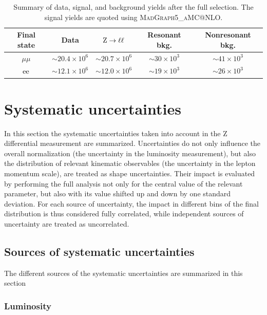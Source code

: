\begin{table}[hbtp]
  \begin{center}
\caption{Summary of data, signal, and background yields after the full selection. 
The signal yields are quoted using \textsc{MadGraph5\_aMC@NLO}.\label{tab:zpt_yields}}
\begin{tabular}{ccccc}
\hline
Final state      & Data & $\mathrm{Z}\to\ell\ell$ & Resonant bkg. & Nonresonant bkg. \\
\hline
$\mu\mu$         & $\sim 20.4 \times 10^{6}$ & $\sim 20.7 \times 10^{6}$ & $\sim 30 \times 10^{3}$ & $\sim 41 \times 10^{3}$ \\
$\mathrm{e}\mathrm{e}$         & $\sim 12.1 \times 10^{6}$ & $\sim 12.0 \times 10^{6}$ & $\sim 19 \times 10^{3}$ & $\sim 26 \times 10^{3}$ \\
\hline
  \end{tabular}
  \end{center}
\end{table}

\section{Systematic uncertainties}

In this section the systematic uncertainties taken into
account in the Z differential measurement are summarized. 
Uncertainties do not only influence the overall normalization
(\eg the uncertainty in the luminosity measurement), but also the
distribution of relevant kinematic observables (\eg the uncertainty in
the lepton momentum scale), are treated as shape uncertainties. Their
impact is evaluated by performing the full analysis not only for the
central value of the relevant parameter, but also with its value
shifted up and down by one standard deviation. For
each source of uncertainty, the impact in different bins of the final 
distribution is thus considered fully correlated, while
independent sources of uncertainty are treated as uncorrelated.

\subsection{Sources of systematic uncertainties}
The different sources of the systematic uncertainties are summarized in this section

\subsubsection{Luminosity}


